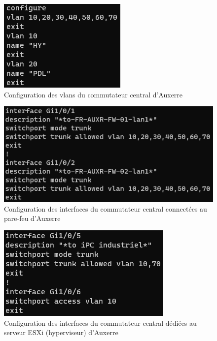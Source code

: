 \documentclass[12pt, oneside, a4paper, titlepage]{report}
\begin{document}
\begin{figure}[h!]
    \centering
    \includegraphics[width = 0.4\linewidth]{img/sw-auxr/vlans.png}
    \caption{Configuration des \glspl{vlan} du commutateur central d'Auxerre}%
    \label{fig:sw-auxr/vlans}
\end{figure}

\begin{figure}[h!]
    \centering
    \includegraphics[width = 0.7\linewidth]{img/sw-auxr/fw-ifs.png}
    \caption{%
        Configuration des interfaces du commutateur central connectées au
        pare-feu d'Auxerre%
    }%
    \label{fig:sw-auxr/fw-ifs}
\end{figure}

\begin{figure}[h!]
    \centering
    \includegraphics[width = 0.5\linewidth]{img/sw-auxr/esxi-ifs.png}
    \caption{%
        Configuration des interfaces du commutateur central dédiées au serveur
        ESXi (hyperviseur) d'Auxerre%
    }%
    \label{fig:sw-auxr/esxi-ifs}
\end{figure}
\FloatBarrier{}
\end{document}
